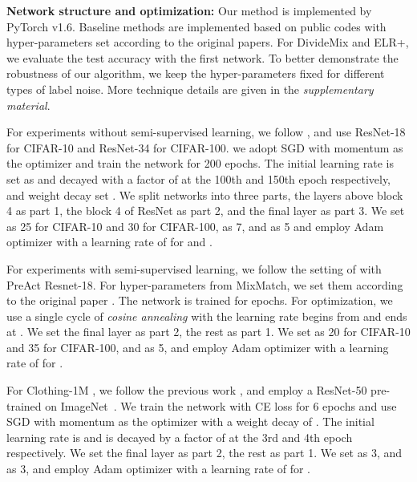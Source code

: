 \documentclass[11pt]{article}
\begin{document}
\textbf{Network structure and optimization:} Our method is implemented by PyTorch v1.6. Baseline methods are implemented based on public codes with hyper-parameters set according to the original papers. For DivideMix and ELR+, we evaluate the test accuracy with the first network. To better demonstrate the robustness of our algorithm, we keep the hyper-parameters fixed for different types of label noise. More technique details are given in the \emph{supplementary material}.

For experiments without semi-supervised learning, we follow \cite{xia2019anchor}, and use ResNet-18 \cite{He2016ResNet} for CIFAR-10 and ResNet-34 for CIFAR-100. we adopt SGD with  momentum as the optimizer and train the network for 200 epochs. The initial learning rate is set as  and decayed with a factor of  at the 100th and 150th epoch respectively, and weight decay set . We split networks into three parts, the layers above block 4 as part 1, the block 4 of ResNet as part 2, and the final layer as part 3. We set  as 25 for CIFAR-10 and 30 for CIFAR-100,  as 7, and  as 5 and employ Adam optimizer with a learning rate of  for  and . 

For experiments with semi-supervised learning, we follow the setting of \cite{Li2020DivideMix} with PreAct Resnet-18. For hyper-parameters from MixMatch, we set them according to the original paper \cite{Berthelot2019MixMatch}. The network is trained for  epochs. For optimization, we use a single cycle of \textit{cosine annealing} \cite{Loshchilov2017CosineLr} with the learning rate begins from  and ends at  . We set the final layer as part 2, the rest as part 1. We set  as 20 for CIFAR-10 and 35 for CIFAR-100, and  as 5, and employ Adam optimizer with a learning rate of  for . 

For Clothing-1M \cite{Xiao2015Clothing}, we follow the previous work \cite{tanaka2018joint}, and employ a ResNet-50 \cite{He2016ResNet} pre-trained on ImageNet~\cite{krizhevsky2012imagenet}. We train the network with CE loss for 6 epochs and use SGD with  momentum as the optimizer with a weight decay of . The initial learning rate is  and is decayed by a factor of  at the 3rd and 4th epoch respectively. We set the final layer as part 2, the rest as part 1. We set  as 3, and  as 3, and employ Adam optimizer with a learning rate of  for . 
\end{document}
